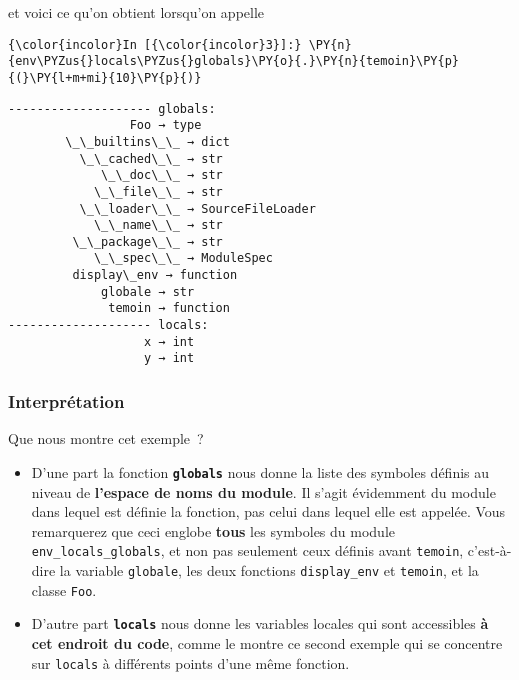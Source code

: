     et voici ce qu'on obtient lorsqu'on appelle

    \begin{Verbatim}[commandchars=\\\{\}]
{\color{incolor}In [{\color{incolor}3}]:} \PY{n}{env\PYZus{}locals\PYZus{}globals}\PY{o}{.}\PY{n}{temoin}\PY{p}{(}\PY{l+m+mi}{10}\PY{p}{)}
\end{Verbatim}


    \begin{Verbatim}[commandchars=\\\{\}]
-------------------- globals:
                 Foo → type
        \_\_builtins\_\_ → dict
          \_\_cached\_\_ → str
             \_\_doc\_\_ → str
            \_\_file\_\_ → str
          \_\_loader\_\_ → SourceFileLoader
            \_\_name\_\_ → str
         \_\_package\_\_ → str
            \_\_spec\_\_ → ModuleSpec
         display\_env → function
             globale → str
              temoin → function
-------------------- locals:
                   x → int
                   y → int

    \end{Verbatim}

    \hypertarget{interpruxe9tation}{%
\subsubsection{Interprétation}\label{interpruxe9tation}}

    Que nous montre cet exemple~?

\begin{itemize}
\item
  D'une part la fonction \textbf{\texttt{globals}} nous donne la liste
  des symboles définis au niveau de \textbf{l'espace de noms du module}.
  Il s'agit évidemment du module dans lequel est définie la fonction,
  pas celui dans lequel elle est appelée. Vous remarquerez que ceci
  englobe \textbf{tous} les symboles du module
  \texttt{env\_locals\_globals}, et non pas seulement ceux définis avant
  \texttt{temoin}, c'est-à-dire la variable \texttt{globale}, les deux
  fonctions \texttt{display\_env} et \texttt{temoin}, et la classe
  \texttt{Foo}.
\item
  D'autre part \textbf{\texttt{locals}} nous donne les variables locales
  qui sont accessibles \textbf{à cet endroit du code}, comme le montre
  ce second exemple qui se concentre sur \texttt{locals} à différents
  points d'une même fonction.
\end{itemize}

